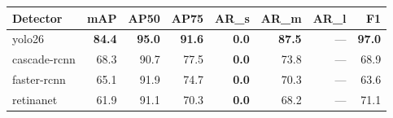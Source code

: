 \begin{tabular}{lrrrrrrr}
\hline
Detector & mAP & AP50 & AP75 & AR_s & AR_m & AR_l & F1 \\
\hline
yolo26 & \textbf{84.4} & \textbf{95.0} & \textbf{91.6} & \textbf{0.0} & \textbf{87.5} & — & \textbf{97.0} \\
cascade-rcnn & 68.3 & 90.7 & 77.5 & \textbf{0.0} & 73.8 & — & 68.9 \\
faster-rcnn & 65.1 & 91.9 & 74.7 & \textbf{0.0} & 70.3 & — & 63.6 \\
retinanet & 61.9 & 91.1 & 70.3 & \textbf{0.0} & 68.2 & — & 71.1 \\
\hline
\end{tabular}
